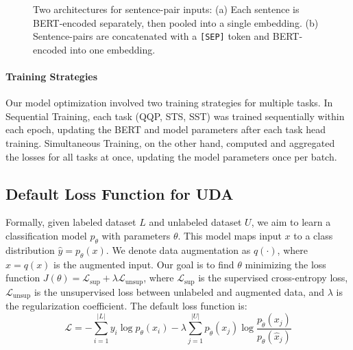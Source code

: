 \documentclass{article}
\begin{document}
\begin{figure}[h]%
  \centering
  \qquad
  \caption{Two architectures for sentence-pair inputs: 
  (a) Each sentence is BERT-encoded separately, then pooled into a single embedding.
  (b) Sentence-pairs are concatenated with a \texttt{[SEP]} token and BERT-encoded into 
  one embedding.
  }%
  \label{fig:example}%
\end{figure}

\paragraph{Training Strategies}
Our model optimization involved two training strategies for multiple tasks. In Sequential 
Training, each task (QQP, STS, SST) was trained sequentially within each epoch, updating 
the BERT and model parameters after each task head training. Simultaneous Training, on the 
other hand, computed and aggregated the losses for all tasks at once, updating the model 
parameters once per batch.

\subsection{Default Loss Function for UDA}
\label{sec:def-uda-loss}
Formally, given labeled dataset $L$ and unlabeled dataset $U$, we aim to learn a 
classification model $p_{\theta}$ with parameters $\theta$. This model maps input $x$ to a 
class distribution $\hat y = p_{\theta}(x)$. We denote data augmentation as $q(\cdot)$, 
where $\hat x = q(x)$ is the augmented input. Our goal is to find $\theta$ minimizing the 
loss function $J(\theta) = \mathcal{L}_{\text{sup}} + \lambda \mathcal{L}_{\text{unsup}}$, 
where $\mathcal{L}_{\text{sup}}$ is the supervised cross-entropy loss, $\mathcal{L}_{\text{unsup}}$ is 
the unsupervised loss between unlabeled and augmented data, and $\lambda$ is the 
regularization coefficient.
The default loss function is:
$$\mathcal{L} = 
- \sum_{i=1}^{|L|} y_i \log p_{\theta}(x_i)
- \lambda \sum_{j=1}^{|U|} p_{\tilde{\theta}}(x_j) \log 
\frac{p_{\tilde{\theta}}(x_j)}{p_{\theta}(\hat x_j)}
$$
\end{document}
